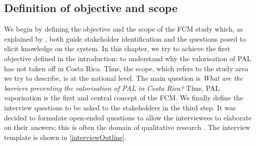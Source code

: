 \begin{table}[H]
\centering
{}
\end{table}



\subsection{Definition of objective and scope}

We begin by defining the objective and the scope of the FCM study which, as explained by \cite{edwards2021building}, both guide stakeholder identification and the questions posed to elicit knowledge on the system. In this chapter, we try to achieve the first objective defined in the introduction: to understand why the valorisation of PAL has not taken off in Costa Rica. Thus, the scope, which refers to the study area we try to describe, is at the national level. The main question is \textit{What are the barriers preventing the valorisation of PAL in Costa Rica?} Thus, PAL vaporisation is the first and central concept of the FCM. We finally define the interview questions to be asked to the stakeholders in the third step. It was decided to formulate open-ended questions to allow the interviewees to elaborate on their answers; this is often the domain of qualitative research \citep{barbrook2022systems}. The interview template is shown in \cref{interviewOutline}.
  
